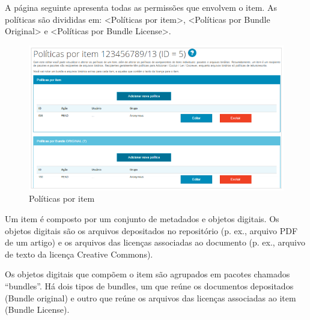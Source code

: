 \documentclass[12pt,hidelinks]{article}
\begin{document}
\newpage

    A página seguinte apresenta todas as permissões que envolvem o item. As políticas são divididas em: <Políticas por item>, <Políticas por Bundle Original> e <Políticas por Bundle License>.
    
    \begin{figure}[!htp]
                \centering
                \includegraphics[scale=0.7]{figura/Figura110.png}
                \caption{Políticas por item}
            \label{Rotulo}
        \end{figure}
        
    Um item é composto por um conjunto de metadados e objetos digitais. Os objetos digitais são os arquivos depositados no repositório (p. ex., arquivo PDF de um artigo) e os arquivos das licenças associadas ao documento (p. ex., arquivo de texto da licença Creative Commons).
    
    \singlespacing
    
    Os objetos digitais que compõem o item são agrupados em pacotes chamados “bundles”. Há dois tipos de bundles, um que reúne os documentos depositados (Bundle original) e outro que reúne os arquivos das licenças associadas ao item (Bundle License).
    
\end{document}
